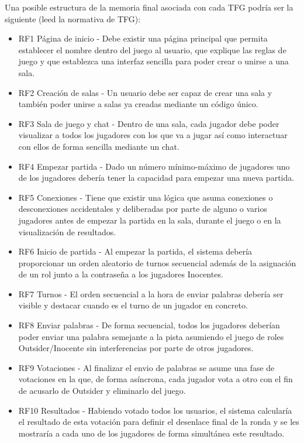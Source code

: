 Una posible estructura de la memoria final asociada con cada TFG podría ser la siguiente (leed la normativa de TFG):
\begin{itemize}
	\item RF1 Página de inicio - Debe existir una página principal que permita establecer el nombre dentro del juego al usuario,
	      que explique las reglas de juego y que establezca una interfaz sencilla para poder crear o unirse a una sala.
	\item RF2 Creación de salas - Un usuario debe ser capaz de crear una sala y también poder unirse a salas ya creadas mediante un
	      código único.
	\item RF3 Sala de juego y chat - Dentro de una sala, cada jugador debe poder visualizar a todos los jugadores con los que va a jugar
	      así como interactuar con ellos de forma sencilla mediante un chat.
	\item RF4 Empezar partida - Dado un número mínimo-máximo de jugadores uno de los jugadores debería tener la capacidad
	      para empezar una nueva partida.
	\item RF5 Conexiones - Tiene que existir una lógica que asuma conexiones o desconexiones accidentales y deliberadas por parte
	      de alguno o varios jugadores antes de empezar la partida en la sala, durante el juego o en la visualización de resultados.
	\item RF6 Inicio de partida - Al empezar la partida, el sistema debería proporcionar un orden aleatorio de turnos secuencial además de
	      la asignación de un rol junto a la contraseña a los jugadores Inocentes.
	\item RF7 Turnos - El orden secuencial a la hora de enviar palabras debería ser visible y destacar cuando es el turno
	      de un jugador en concreto.
	\item RF8 Enviar palabras - De forma secuencial, todos los jugadores deberían poder enviar una palabra semejante a la pista asumiendo
	      el juego de roles Outsider/Inocente sin interferencias por parte de otros jugadores.
	\item RF9 Votaciones - Al finalizar el envio de palabras se asume una fase de votaciones en la que, de forma asíncrona,
	      cada jugador vota a otro con el fin de acusarlo de Outsider y eliminarlo del juego.
	\item RF10 Resultados - Habiendo votado todos los usuarios, el sistema calcularía el resultado de esta votación para definir el
	      desenlace final de la ronda y se les mostraría a cada uno de los jugadores de forma simultánea este resultado.

\end{itemize}
